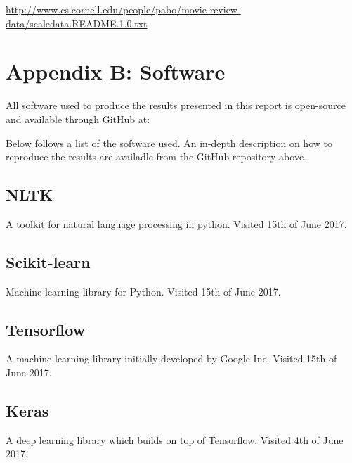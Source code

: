 \documentclass[a4paper]{article}
\begin{document}
\url{http://www.cs.cornell.edu/people/pabo/movie-review-data/scaledata.README.1.0.txt}

\pagebreak
\section{Appendix B: Software}
\label{app:B}

All software used to produce the results presented in this report is open-source
and available through GitHub at:


Below follows a list of the software used. An in-depth description on how
to reproduce the results are availadle from the GitHub repository above.

\subsection{NLTK}
A toolkit for natural language processing in python. Visited 15th of June 2017.


\subsection{Scikit-learn}
Machine learning library for Python. Visited 15th of June 2017.


\subsection{Tensorflow}
A machine learning library initially developed by Google Inc.
Visited 15th of June 2017.


\subsection{Keras}
A deep learning library which builds on top of Tensorflow.
Visited 4th of June 2017.

\end{document}
